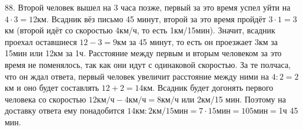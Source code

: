 88. Второй человек вышел на 3 часа позже, первый за это время успел уйти на $4\cdot3=12$км. Всадник вёз письмо 45 минут, второй за это время пройдёт $3\cdot1=3$км (второй идёт со скоростью 4км/ч, то есть 1км/15мин). Значит, всадник проехал оставшиеся $12-3=9$км за 45 минут, то есть он проезжает 3км за 15мин или 12км за 1ч. Расстояние между первым и вторым человеком за это время не поменялось, так как они идут с одинаковой скоростью. За те полчаса, что он ждал ответа, первый человек увеличит расстояние между ними на $4:2=2$км и оно будет составлять $12+2=14$км. Всадник будет догонять первого человека со скоростью $12\text{км/ч}-4\text{км/ч}=8\text{км/ч}$ или 2км/15 мин. Поэтому на доставку ответа ему понадобится $14\text{км}:2\text{км/15мин}=7\cdot15\text{мин}=105\text{мин}=$1ч 45 мин.\\
